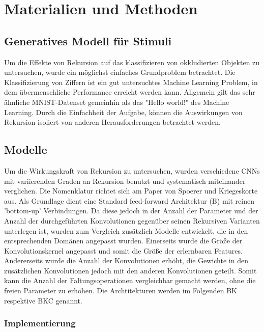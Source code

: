 \section{Materialien und Methoden}\label{Materialien und Methoden}
\subsection{Generatives Modell für Stimuli}
Um die Effekte von Rekursion auf das klassifizieren von okkludierten Objekten zu untersuchen, wurde ein möglichst einfaches Grundproblem betrachtet. Die Klassifizierung von Ziffern ist ein gut untersuchtes Machine Learning Problem, in dem übermenschliche Performance erreicht werden kann. Allgemein gilt das sehr ähnliche MNIST-Datenset gemeinhin als das "Hello world!" des Machine Learning. Durch die Einfachheit der Aufgabe, können die Auswirkungen von Rekursion isoliert von anderen Herausforderungen betrachtet werden. 
\subsection{Modelle}
Um die Wirkungskraft von Rekursion zu untersuchen, wurden verschiedene CNNs mit variierenden Graden an Rekursion benutzt und systematisch miteinander verglichen. Die Nomenklatur richtet sich am Paper von Spoerer und Kriegeskorte aus. Als Grundlage dient eine Standard feed-forward Architektur (B) mit reinen 'bottom-up' Verbindungen. Da diese jedoch in der Anzahl der Parameter und der Anzahl der durchgeführten Konvolutionen gegenüber seinen Rekursiven Varianten unterlegen ist, wurden zum Vergleich zusätzlich Modelle entwickelt, die in den entsprechenden Domänen angepasst wurden. Einerseits wurde die Größe der Konvolutionskernel angepasst und somit die Größe der erlernbaren Features. Andererseits wurde die Anzahl der Konvolutionen erhöht, die Gewichte in den zusätzlichen Konvolutionen jedoch mit den anderen Konvolutionen geteilt. Somit kann die Anzahl der Faltungsoperationen vergleichbar gemacht werden, ohne die freien Parameter zu erhöhen. Die Archtitekturen werden im Folgenden BK respektive BKC genannt. 
\subsubsection{Implementierung}
